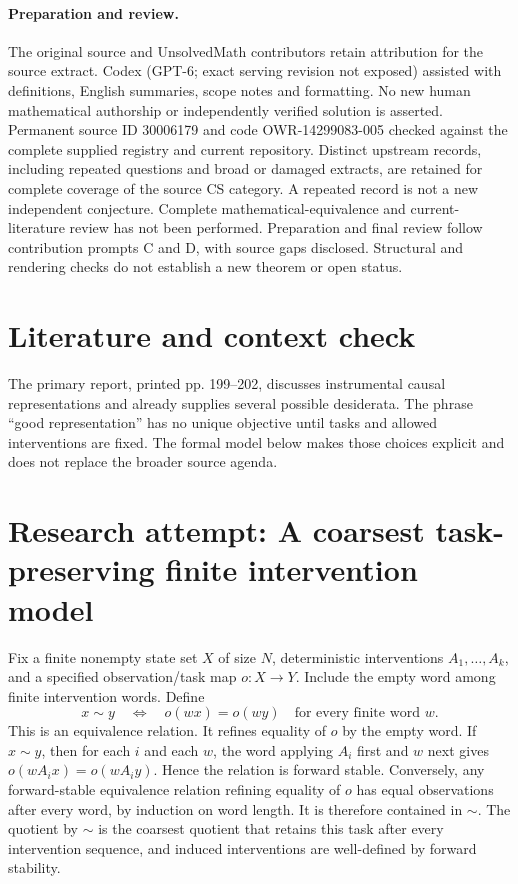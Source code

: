 \documentclass[11pt]{article}
\begin{document}
\paragraph{Preparation and review.}
The original source and UnsolvedMath contributors retain attribution for the source extract. Codex (GPT-6; exact serving revision not exposed) assisted with definitions, English summaries, scope notes and formatting. No new human mathematical authorship or independently verified solution is asserted. Permanent source ID 30006179 and code OWR-14299083-005 checked against the complete supplied registry and current repository. Distinct upstream records, including repeated questions and broad or damaged extracts, are retained for complete coverage of the source CS category. A repeated record is not a new independent conjecture. Complete mathematical-equivalence and current-literature review has not been performed. Preparation and final review follow contribution prompts C and D, with source gaps disclosed. Structural and rendering checks do not establish a new theorem or open status.
\label{end:30006179}

\section{Literature and context check}
The primary report, printed pp. 199--202, discusses instrumental causal representations and already supplies several possible desiderata. The phrase ``good representation'' has no unique objective until tasks and allowed interventions are fixed. The formal model below makes those choices explicit and does not replace the broader source agenda.
\section{Research attempt: A coarsest task-preserving finite intervention model}

Fix a finite nonempty state set $X$ of size $N$, deterministic interventions $A_1,\ldots,A_k$, and a specified observation/task map $o:X\to Y$. Include the empty word among finite intervention words. Define
\[
x\sim y\quad\Longleftrightarrow\quad o(w x)=o(w y)
\quad\text{for every finite word }w.
\]
This is an equivalence relation. It refines equality of $o$ by the empty word. If $x\sim y$, then for each $i$ and each $w$, the word applying $A_i$ first and $w$ next gives $o(w A_i x)=o(w A_i y)$. Hence the relation is forward stable. Conversely, any forward-stable equivalence relation refining equality of $o$ has equal observations after every word, by induction on word length. It is therefore contained in $\sim$. The quotient by $\sim$ is the coarsest quotient that retains this task after every intervention sequence, and induced interventions are well-defined by forward stability.
\end{document}
